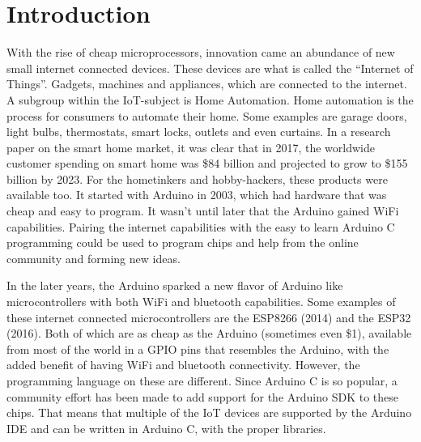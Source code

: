 \chapter{Introduction}\label{ch:introduction}
With the rise of cheap microprocessors, innovation came an abundance of new small internet connected devices. These devices are what is called the “Internet of Things”. Gadgets, machines and appliances, which are connected to the internet\cite{iot-definition}. A subgroup within the IoT-subject is Home Automation. Home automation is the process for consumers to automate their home. Some examples are garage doors, light bulbs, thermostats, smart locks, outlets and even curtains. In a research paper\cite{home-auto-growth} on the smart home market, it was clear that in 2017, the worldwide customer spending on smart home was \$84 billion and projected to grow to \$155 billion by 2023. For the hometinkers and hobby-hackers, these products were available too. It started with Arduino in 2003, which had hardware that was cheap and easy to program\cite{arduino-history}. It wasn’t until later that the Arduino gained WiFi capabilities. Pairing the internet capabilities with the easy to learn Arduino C programming could be used to program chips and help from the online community and forming new ideas.

In the later years, the Arduino sparked a new flavor of Arduino like microcontrollers with both WiFi and bluetooth capabilities. Some examples of these internet connected microcontrollers are the ESP8266 (2014) and the ESP32 (2016). Both of which are as cheap as the Arduino (sometimes even \$1), available from most of the world in a GPIO pins that resembles the Arduino, with the added benefit of having WiFi and bluetooth connectivity. However, the programming language on these are different. Since Arduino C is so popular, a community effort has been made to add support for the Arduino SDK to these chips. That means that multiple of the IoT devices are supported by the Arduino IDE and can be written in Arduino C, with the proper libraries.

